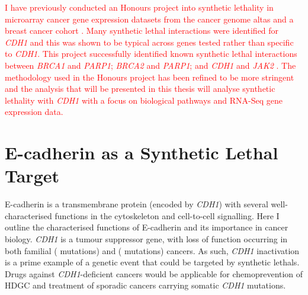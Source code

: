 \textcolor{red}{
I have previously conducted an Honours project \citep{Kelly2013} into synthetic lethality in microarray cancer gene expression datasets from the cancer genome altas \citep{TCGA2013PAN} and a breast cancer cohort \citep{Soon2011}. Many synthetic lethal interactions were identified for \textit{CDH1} and this was shown to be typical across genes tested rather than specific to \textit{CDH1}. This project successfully identified known synthetic lethal interactions between \textit{BRCA1} and \textit{PARP1}; \textit{BRCA2} and \textit{PARP1}; and \textit{CDH1} and \textit{JAK2} \citep{Bryant2005, Farmer2005, Telford2015}. The methodology used in the Honours project has been refined to be more stringent and the analysis that will be presented in this thesis will analyse synthetic lethality with \textit{CDH1} with a focus on biological pathways and RNA-Seq gene expression data.  
}



\section{E-cadherin as a Synthetic Lethal Target}
\label{CDH1_section}

\gls{E-cadherin} is a transmembrane protein (encoded by \textit{CDH1}) with several well-characterised functions in the cytoskeleton and cell-to-cell signalling. Here I outline the characterised functions of \gls{E-cadherin} and its importance in cancer biology. \textit{CDH1} is a \gls{tumour suppressor} gene, with loss of function occurring in both \gls{familial} ( \glspl{mutation}) and  ( \glspl{mutation}) cancers. As such, \textit{CDH1} inactivation is a prime example of a genetic event that could be targeted by \glspl{synthetic lethal}. %
Drugs against \textit{CDH1}-deficient cancers would be applicable for \gls{chemoprevention} of \gls{HDGC} and \gls{treatment} of sporadic cancers carrying somatic \textit{CDH1} \glspl{mutation}.

